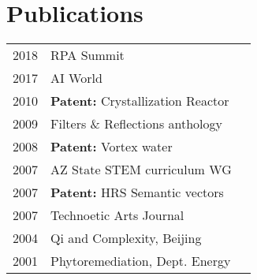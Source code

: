 \documentclass[letterpaper]{deedy-resume} %
\begin{document}
\begin{minipage}[t]{0.33\textwidth}
\section{Publications}

\begin{tabular}{rll}
2018 & RPA Summit\\
2017 & AI World\\
2010 & \textbf{Patent:} Crystallization Reactor\\
2009 & Filters \& Reflections anthology\\
2008 & \textbf{Patent:} Vortex water\\
2007 & AZ State STEM curriculum WG\\
2007 & \textbf{Patent:} HRS Semantic vectors\\
2007 & Technoetic Arts Journal\\
2004 & Qi and Complexity, Beijing\\
2001 & Phytoremediation, Dept. Energy\\
\end{tabular}

\sectionspace %



\end{minipage} %
\hfill
%
%
\end{document}

